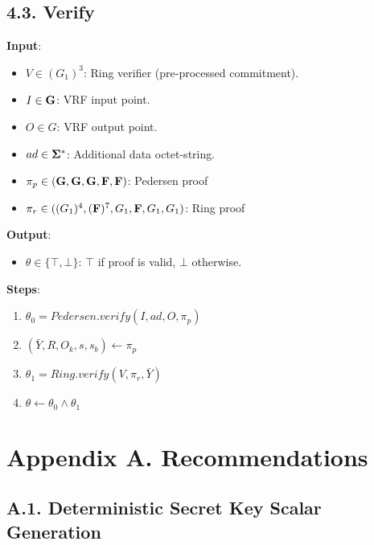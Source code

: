 \documentclass[
]{article}
\providecommand{\tightlist}{%
  \setlength{\itemsep}{0pt}\setlength{\parskip}{0pt}}
\begin{document}
\subsection{4.3. Verify}\label{verify-2}

\textbf{Input}:

\begin{itemize}
\tightlist
\item
  \(V \in (G_1)^3\): Ring verifier (pre-processed commitment).
\item
  \(I \in \bold{G}\): VRF input point.
\item
  \(O \in G\): VRF output point.
\item
  \(ad \in \bold{\Sigma}^*\): Additional data octet-string.
\item
  \(\pi_p \in (\bold{G}, \bold{G}, \bold{G}, \bold{F}, \bold{F})\):
  Pedersen proof
\item
  \(\pi_r \in ((G_1)^4, (\bold{F})^7, G_1, \bold{F}, G_1, G_1)\): Ring
  proof
\end{itemize}

\textbf{Output}:

\begin{itemize}
\tightlist
\item
  \(\theta \in \{ \top, \bot \}\): \(\top\) if proof is valid, \(\bot\)
  otherwise.
\end{itemize}

\textbf{Steps}:

\begin{enumerate}
\def\labelenumi{\arabic{enumi}.}
\tightlist
\item
  \(\theta_0 = Pedersen.verify(I, ad, O, \pi_p)\)
\item
  \((\bar{Y}, R, O_k, s, s_b) \gets \pi_p\)
\item
  \(\theta_1 = Ring.verify(V, \pi_r, \bar{Y})\)
\item
  \(\theta \gets \theta_0 \land \theta_1\)
\end{enumerate}

\section{Appendix A. Recommendations}\label{appendix-a.-recommendations}

\subsection{A.1. Deterministic Secret Key Scalar
Generation}\label{a.1.-deterministic-secret-key-scalar-generation}
\end{document}
